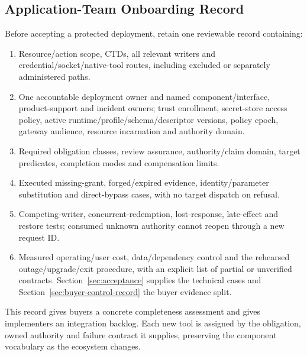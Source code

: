\subsection{Application-Team Onboarding Record}
Before accepting a protected deployment, retain one reviewable record containing:
\begin{enumerate}
\item Resource/action scope, CTDs, all relevant writers and credential/socket/native-tool routes, including excluded or separately administered paths.
\item One accountable deployment owner and named component/interface, product-support and incident owners; trust enrollment, secret-store access policy, active runtime/profile/schema/descriptor versions, policy epoch, gateway audience, resource incarnation and authority domain.
\item Required obligation classes, review assurance, authority/claim domain, target predicates, completion modes and compensation limits.
\item Executed missing-grant, forged/expired evidence, identity/parameter substitution and direct-bypass cases, with no target dispatch on refusal.
\item Competing-writer, concurrent-redemption, lost-response, late-effect and restore tests; consumed unknown authority cannot reopen through a new request ID.
\item Measured operating/user cost, data/dependency control and the rehearsed outage/upgrade/exit procedure, with an explicit list of partial or unverified contracts. Section~\ref{sec:acceptance} supplies the technical cases and Section~\ref{sec:buyer-control-record} the buyer evidence split.
\end{enumerate}

This record gives buyers a concrete completeness assessment and gives implementers an integration backlog. Each new tool is assigned by the obligation, owned authority and failure contract it supplies, preserving the component vocabulary as the ecosystem changes.
